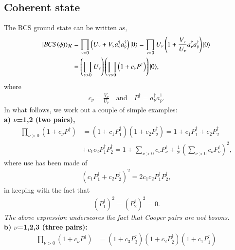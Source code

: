 

\begin{subappendices} 
\section[Coherent state]{Coherent state}\label{App3E}
The BCS ground state can be written as,
\begin{align}\label{eq1App3Ex} 
\nonumber |{BCS(\phi)} \rangle_{\mathcal K}&=\prod_{\nu>0}\left(U_\nu+V_\nu a_\nu^\dagger a_{\bar{\nu}}^\dagger\right)|{0} \rangle=\prod_{\nu>0}U_\nu\left(1+\frac{V_\nu}{U_\nu} a_\nu^\dagger a_{\bar{\nu}}^\dagger\right)|{0} \rangle\\
&=\left(\prod_{\nu>0}U_\nu\right)\left(\prod_{\nu>0}\left(1+c_\nu P^\dagger\right)\right)|{0} \rangle,
\end{align}
where
\begin{align}\label{eq2App3Ex} 
 c_\nu=\frac{V_\nu}{U_\nu}\quad\text{and}\quad P^\dagger=a_\nu^\dagger a_{\bar{\nu}}^\dagger.
\end{align}
In what follows, we work out a couple of simple examples:\\
\textbf{a) $\nu$=1,2 (two pairs),}
\begin{align}\label{eq2App4Ex} 
 \nonumber \prod_{\nu>0}\left(1+c_\nu P^\dagger\right)&=\left(1+c_1P_1^\dagger\right)\left(1+c_2P_2^\dagger\right)=1+c_1P_1^\dagger+c_2P_2^\dagger\\
 &+c_1c_2P_1^\dagger P_2^\dagger=1+\sum_{\nu>0}c_\nu P_\nu^\dagger + \frac{1}{2!}\left(\sum_{\nu>0}c_\nu P^\dagger_\nu\right)^2,
\end{align}
where use has been made of
\begin{align}\label{eq2App5Ex} 
\left(c_1P_1^\dagger+ c_2P_2^\dagger\right)^2=2c_1c_2P_1^\dagger P_2^\dagger,
\end{align}
in keeping with  the fact that
\begin{align}\label{eq2App6Ex}
\left(P_1^\dagger\right)^2=\left(P_2^\dagger\right)^2=0.
\end{align}
\textit{The above expression underscores the fact that Cooper pairs are not bosons.}\\
\textbf{b) $\nu$=1,2,3 (three pairs):}
\begin{align}\label{eq2App7Ex}
\nonumber \prod_{\nu>0}\left(1+c_\nu P^\dagger\right)&=\left(1+c_3P_3^\dagger\right)\left(1+c_2P_2^\dagger\right)\left(1+c_1P_1^\dagger\right)\\

\end{align}
\end{subappendices}
